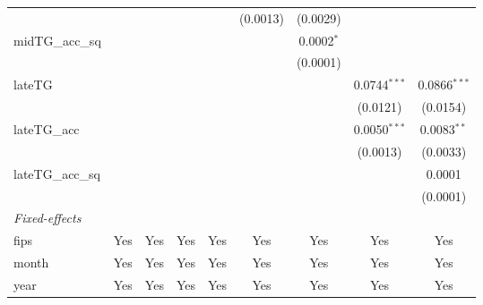 \documentclass{article}
\begin{document}
\begin{appendices}
\begin{table}[htbp]
\begin{tabular}{lcccccccc}
                         &                 &                 &                 &                        & (0.0013)        & (0.0029)        &                 &   \\   
      midTG\_acc\_sq     &                 &                 &                 &                        &                 & 0.0002$^{*}$    &                 &   \\   
                         &                 &                 &                 &                        &                 & (0.0001)        &                 &   \\   
      lateTG             &                 &                 &                 &                        &                 &                 & 0.0744$^{***}$  & 0.0866$^{***}$\\   
                         &                 &                 &                 &                        &                 &                 & (0.0121)        & (0.0154)\\   
      lateTG\_acc        &                 &                 &                 &                        &                 &                 & 0.0050$^{***}$  & 0.0083$^{**}$\\   
                         &                 &                 &                 &                        &                 &                 & (0.0013)        & (0.0033)\\   
      lateTG\_acc\_sq    &                 &                 &                 &                        &                 &                 &                 & 0.0001\\   
                         &                 &                 &                 &                        &                 &                 &                 & (0.0001)\\   
      \midrule
      \emph{Fixed-effects}\\
      fips               & Yes             & Yes             & Yes             & Yes                    & Yes             & Yes             & Yes             & Yes\\  
      month              & Yes             & Yes             & Yes             & Yes                    & Yes             & Yes             & Yes             & Yes\\  
      year               & Yes             & Yes             & Yes             & Yes                    & Yes             & Yes             & Yes             & Yes\\  

\end{tabular}
\end{table}
\end{appendices}
\end{document}

